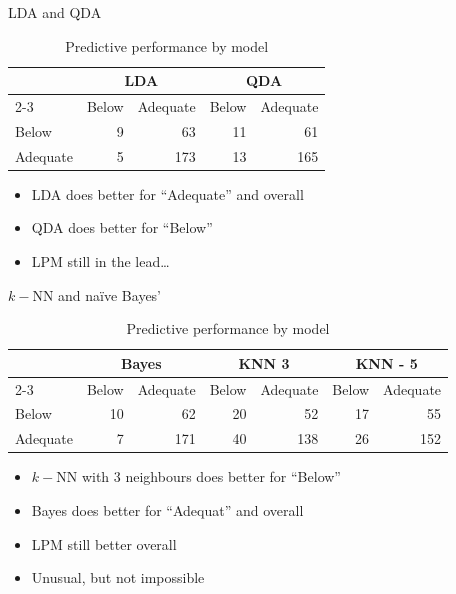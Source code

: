 \documentclass[
  ignorenonframetext,
]{beamer}
\providecommand{\tightlist}{%
  \setlength{\itemsep}{0pt}\setlength{\parskip}{0pt}}
\begin{document}
\begin{frame}{LDA and QDA}
\protect{}\label{lda-and-qda}
\small

\begin{table}

\caption{\label{tab:discriminant}Predictive performance by model}
\centering
\begin{tabular}[t]{l|r|r|r|r}
\hline
\multicolumn{1}{c|}{ } & \multicolumn{2}{c|}{LDA} & \multicolumn{2}{c}{QDA} \\
\cline{2-3} \cline{4-5}
  & Below & Adequate & Below & Adequate\\
\hline
Below & 9 & 63 & 11 & 61\\
\hline
Adequate & 5 & 173 & 13 & 165\\
\hline
\end{tabular}
\end{table}

\normalsize

\begin{itemize}
\tightlist
\item
  LDA does better for ``Adequate'' and overall
\item
  QDA does better for ``Below''
\item
  LPM still in the lead\ldots{}
\end{itemize}
\end{frame}

\begin{frame}{\(k-\)NN and naïve Bayes'}
\protect{}\label{k-nn-and-nauxefve-bayes}
\small

\begin{table}

\caption{\label{tab:bayes-knn}Predictive performance by model}
\centering
\begin{tabular}[t]{l|r|r|r|r|r|r}
\hline
\multicolumn{1}{c|}{ } & \multicolumn{2}{c|}{Bayes} & \multicolumn{2}{c|}{KNN 3} & \multicolumn{2}{c}{KNN - 5} \\
\cline{2-3} \cline{4-5} \cline{6-7}
  & Below & Adequate & Below & Adequate & Below & Adequate\\
\hline
Below & 10 & 62 & 20 & 52 & 17 & 55\\
\hline
Adequate & 7 & 171 & 40 & 138 & 26 & 152\\
\hline
\end{tabular}
\end{table}

\normalsize

\begin{itemize}
\tightlist
\item
  \(k-\)NN with 3 neighbours does better for ``Below''
\item
  Bayes does better for ``Adequat'' and overall
\item
  LPM still better overall
\item
  Unusual, but not impossible
\end{itemize}
\end{frame}
\end{document}
